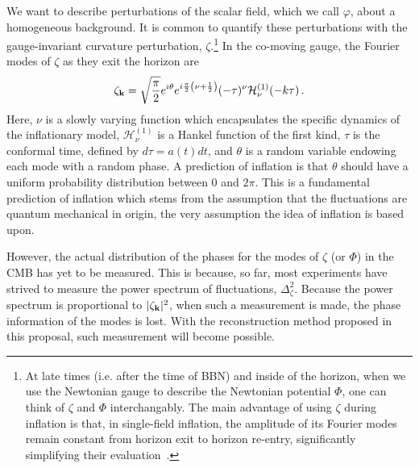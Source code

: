 \documentclass[psfig,11pt]{article}
\def\be{\begin{equation}}
\def\ee{\end{equation}}
\begin{document}
{We want to describe perturbations of the scalar field, which we call $\varphi$, about a homogeneous background. It is common to quantify these perturbations with the gauge-invariant curvature perturbation, $\zeta$.\footnote{At late times (i.e. after the time of BBN) and inside of the horizon, when we use the Newtonian gauge to describe the Newtonian potential $\Phi$, one can think of $\zeta$ and $\Phi$ interchangably. The main advantage of using $\zeta$ during inflation is that, in single-field inflation, the amplitude of its Fourier modes remain constant from horizon exit to horizon re-entry, significantly simplifying their evaluation~\cite{Weinberg2008}.}
 In the co-moving gauge, the Fourier modes of $\zeta$ as they exit the horizon are
\be
	\zeta_{{\bf k}}=\sqrt{\frac{\pi}{2}}e^{i\theta}e^{i\frac{\pi}{2}\left(\nu+\frac{1}{2}\right)}(-\tau)^{\nu}\mathcal{H}^{(1)}_\nu(-k\tau)\, .
\ee
Here, $\nu$ is a slowly varying function which encapsulates the specific dynamics of the inflationary model, $\mathcal{H}^{(1)}_\nu$ is a Hankel function of the first kind, $\tau$ is the conformal time, defined by $d\tau=a(t)dt$, and $\theta$ is a random variable endowing each mode with a random phase. A prediction of inflation is that $\theta$ should have a uniform probability distribution between 0 and $2\pi$. This is a fundamental prediction of inflation which stems from the assumption that the fluctuations are quantum mechanical in origin, the very assumption the idea of inflation is based upon.

However, the actual distribution of the phases for the modes of $\zeta$ (or $\Phi$) in the CMB has yet to be measured. This is because, so far, most experiments have strived to measure the power spectrum of fluctuations, $\Delta_\zeta^2$. %
Because the power spectrum is proportional to $ |\zeta_{{\bf k}}|^2$, when such a measurement is made, the phase information of the modes is lost. With the reconstruction method proposed in this proposal, such measurement will become possible.

}
\end{document}
